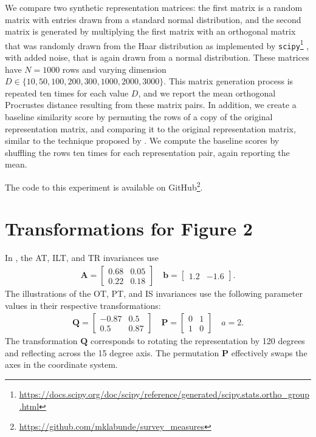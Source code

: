 \documentclass{article}
\newcommand{\citet}{\textcite}
\begin{document}
\begin{refsegment}
We compare two synthetic representation matrices:
the first matrix is a random matrix with entries drawn from a standard normal distribution, and the second matrix is generated by multiplying the first matrix with an orthogonal matrix that was randomly drawn from the Haar distribution as implemented by \texttt{scipy}\footnote{\url{https://docs.scipy.org/doc/scipy/reference/generated/scipy.stats.ortho_group.html}} \cite{mezzadri_how_2007}, with added noise, that is again drawn from a normal distribution.
These matrices have $N=1000$ rows and varying dimension $D \in \{10, 50, 100, 200, 300, 1000, 2000, 3000\}$.
This matrix generation process is repeated ten times for each value $D$, and we report the mean orthogonal Procrustes distance resulting from these matrix pairs.
In addition, we create a baseline similarity score by permuting the rows of a copy of the original representation matrix, and comparing it to the original representation matrix, similar to the technique proposed by \citet{kriegeskorte_representational_2008}.
We compute the baseline scores by shuffling the rows ten times for each representation pair, again reporting the mean.

The code to this experiment is available on GitHub\footnote{ \url{https://github.com/mklabunde/survey_measures}}.





\section{Transformations for Figure 2}\label{ap:fig2_transforms}
In , the AT, ILT, and TR invariances use
\begin{align*}
  \mathbf{A}=\begin{bmatrix} 0.68 & 0.05\\0.22&0.18 \end{bmatrix} \quad  \mathbf{b} = \begin{bmatrix} 1.2 & -1.6 \end{bmatrix}.
\end{align*}
The illustrations of the OT, PT, and IS invariances use the following parameter values in their respective transformations:
\begin{align*}
  \mathbf{Q} = \begin{bmatrix}-0.87 & 0.5 \\ 0.5 & 0.87\end{bmatrix} \quad  \mathbf{P}=\begin{bmatrix} 0 & 1\\1&0 \end{bmatrix} \quad a = 2.
\end{align*}
The transformation $\bm{Q}$ corresponds to rotating the representation by 120 degrees and reflecting across the 15 degree axis.
The permutation $\bm{P}$ effectively swaps the axes in the coordinate system.

\printbibliography[filter=onlyapx]

\end{refsegment}
\end{document}

